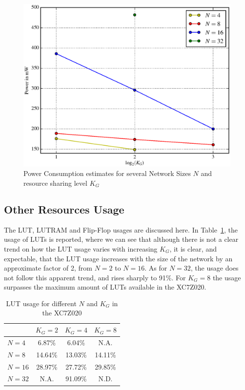 \begin{figure}
    \centering
    \includegraphics[width=\linewidth]{figures/power.eps}
    \caption[Power consumption estimates for several Network Sizes $N$ and resource sharing level $K_G$]{Power Consumption estimates for several Network Sizes $N$ and resource sharing level $K_G$}
    \label{fig:power}
\end{figure}

\subsection{Other Resources Usage}\label{sec:res-synth-otheres}
The LUT, LUTRAM and Flip-Flop usages are discussed here. In Table~\ref{tab:lut}, the usage of LUTs is reported, where we can see
that although there is not a clear trend on how the LUT usage varies with increasing $K_G$, it is clear, and expectable, that
the LUT usage increases with the size of the network by an approximate factor of 2, from $N=2$ to $N=16$. As for $N=32$, the
usage does not follow this apparent trend, and rises sharply to 91\%. For $K_G = 8$ the usage surpasses the maximum amount
of LUTs available in the XC7Z020.

\begin{table}

    \centering
  \begin{tabular}{ | l | c | c | c |}
    \hline
    & $K_G=2$  & $K_G=4$ & $K_G=8$ \\
    \hline
    $N=4$ & 6.87\% & 6.04\% & N.A. \\
    \hline
    $N=8$ & 14.64\% & 13.03\% & 14.11\% \\
    \hline
    $N=16$ & 28.97\% & 27.72\% & 29.85\% \\
    \hline
    $N=32$ & N.A. & 91.09\% & N.D. \\
\hline
  \end{tabular}
  \caption{LUT usage for different $N$ and $K_G$ in the XC7Z020}
  \label{tab:lut}
\end{table}

